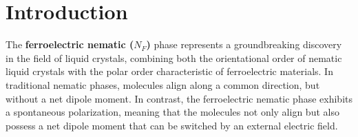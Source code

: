 \section{Introduction}
The \textbf{ferroelectric nematic ($N_F$)} phase represents a groundbreaking discovery in the field of liquid crystals, combining both the orientational order of nematic liquid crystals with the polar order characteristic of ferroelectric materials. 
In traditional nematic phases, molecules align along a common direction, but without a net dipole moment.
In contrast, the ferroelectric nematic phase exhibits a spontaneous polarization, meaning that the molecules not only align but also possess a net dipole moment that can be switched by an external electric field.
